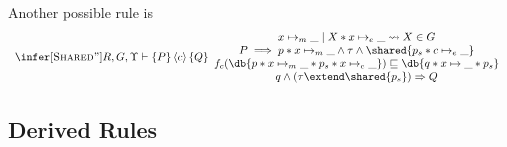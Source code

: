 Another possible rule is 
\[
\begin{array}{c}
%
\infer[\textsc{Shared''}]{
R, G, \Upsilon \vdash 
\{P \}
\, \langle c \rangle\, 
\{ Q \} %
}{
\begin{array}{c}  
x\mapsto_m\_ \mid X*x\mapsto_e\_ \leadsto X \in G
\\
P  \implies  p * x\mapsto_m\_  \wedge \tau \wedge \shared{p_s * c\mapsto_e\_}
\\
f_c(\db{p * x\mapsto_m\_  * p_s * x \mapsto_e \_}) \sqsubseteq \db{q * x \mapsto \_ * p_s}
\\
q \wedge (\tau \extend \shared{p_s})
\Rightarrow  
Q
\end{array}
}
\end{array}
\]

\subsection{Derived  Rules}


